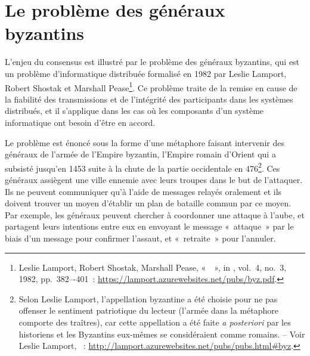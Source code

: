 \section*{Le problème des généraux byzantins} %


L'enjeu du consensus est illustré par le problème des généraux byzantins, qui est un problème d'informatique distribuée formalisé en 1982 par Leslie Lamport, Robert Shostak et Marshall Pease\footnote{Leslie Lamport, Robert Shostak, Marshall Pease, «~~», in , vol.~4, no.~3, 1982, pp.~382–-401~: \url{https://lamport.azurewebsites.net/pubs/byz.pdf}.}. Ce problème traite de la remise en cause de la fiabilité des transmissions et de l'intégrité des participants dans les systèmes distribués, et il s'applique dans les cas où les composants d'un système informatique ont besoin d'être en accord.

Le problème est énoncé sous la forme d'une métaphore faisant intervenir des généraux de l'armée de l'Empire byzantin, l'Empire romain d'Orient qui a subsisté jusqu'en 1453 suite à la chute de la partie occidentale en 476\footnote{Selon Leslie Lamport, l'appellation byzantine a été choisie pour ne pas offenser le sentiment patriotique du lecteur (l'armée dans la métaphore comporte des traîtres), car cette appellation a été faite \emph{a posteriori} par les historiens et les Byzantins eux-mêmes se considéraient comme romains. -- Voir Leslie Lamport, ~: \url{http://lamport.azurewebsites.net/pubs/pubs.html\#byz}.}. Ces généraux assiègent une ville ennemie avec leurs troupes dans le but de l'attaquer. Ils ne peuvent communiquer qu'à l'aide de messages relayés oralement et ils doivent trouver un moyen d'établir un plan de bataille commun par ce moyen. Par exemple, les généraux peuvent chercher à coordonner une attaque à l'aube, et partagent leurs intentions entre eux en envoyant le message «~attaque~» par le biais d'un message pour confirmer l'assaut, et «~retraite~» pour l'annuler. %



